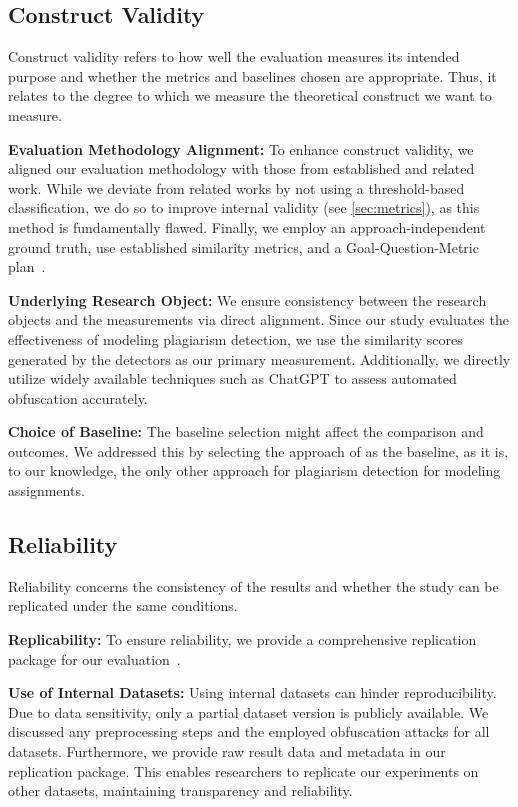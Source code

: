\subsection{Construct Validity}
Construct validity refers to how well the evaluation measures its intended purpose and whether the metrics and baselines chosen are appropriate. Thus, it relates to the degree to which we measure the theoretical construct we want to measure.

    \textbf{Evaluation Methodology Alignment:} To enhance construct validity, we aligned our evaluation methodology with those from established and related work. While we deviate from related works by not using a threshold-based classification, we do so to improve internal validity (see \autoref{sec:metrics}), as this method is fundamentally flawed. Finally, we employ an approach-independent ground truth, use established similarity metrics, and a Goal-Question-Metric plan~\cite{Basili1984, Basili1992}.

    \textbf{Underlying Research Object:} We ensure consistency between the research objects and the measurements via direct alignment. Since our study evaluates the effectiveness of modeling plagiarism detection, we use the similarity scores generated by the detectors as our primary measurement. Additionally, we directly utilize widely available techniques such as ChatGPT to assess automated obfuscation accurately.

    \textbf{Choice of Baseline:} The baseline selection might affect the comparison and outcomes. We addressed this by selecting the approach of \citet{Martinez2020} as the baseline, as it is, to our knowledge, the only other approach for plagiarism detection for modeling assignments.

\subsection{Reliability}
Reliability concerns the consistency of the results and whether the study can be replicated under the same conditions.


    \textbf{Replicability:} To ensure reliability, we provide a comprehensive replication package for our evaluation~.

    \textbf{Use of Internal Datasets:} Using internal datasets can hinder reproducibility. Due to data sensitivity, only a partial dataset version is publicly available. We discussed any preprocessing steps and the employed obfuscation attacks for all datasets. Furthermore, we provide raw result data and metadata in our replication package. This enables researchers to replicate our experiments on other datasets, maintaining transparency and reliability.

